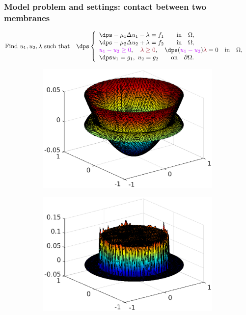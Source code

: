
\begin{frame}
\frametitle{Model problem and settings: contact between two membranes}
\vspace{-1.7 cm}
\begin{equation*}
\mbox{Find} \ u_1, u_2, \lambda \ \mbox{such that} \quad
\dps
\left\lbrace\begin{array}{llccc}
\dps -\mu_1 \Delta u_1-\lambda = f_1 \qquad \mbox{in} \quad \Omega, \\
\dps -\mu_2 \Delta u_2+\lambda = f_2 \qquad \mbox{in} \quad \Omega,\\
\textcolor{electricpurple}{u_1-u_2 \geq 0}, \quad 
\textcolor{carmine}{\lambda \geq 0}, \quad \dps (\textcolor{electricpurple}{u_1-u_2})\textcolor{carmine}{\lambda}=0 \quad \mbox{in} \quad \Omega, \hspace{0.2 cm}\\
\dps u_1=g_1, \ u_2=g_2  \qquad \mbox{on} \quad\partial \Omega.
\end{array}
\right.
\end{equation*}
\vspace{-0.8 cm}
\begin{figure}
\begin{subfigure}[normal]{0.44\textwidth} 
\includegraphics[width=\textwidth]{fig_article_chap_1/fig_membrane_cv.eps}    
\end{subfigure}
\qquad
\begin{subfigure}[normal]{0.44\textwidth}
\includegraphics[width=\textwidth]{fig_article_chap_1/fig_lambda_cv.eps}     

\end{subfigure}
\end{figure}
\end{frame}
